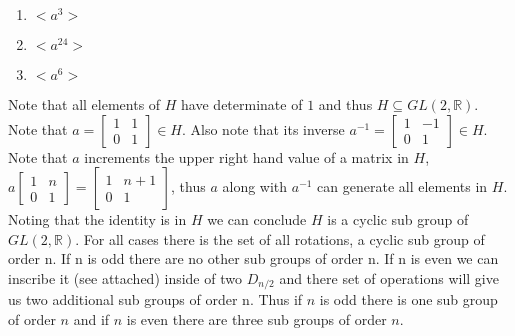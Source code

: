\documentclass[12pt]{article}
\makeatletter
\theoremstyle{homework}
\newenvironment{exercise}[1]
{\def\@currentlabel{#1}\exercisecore}
{\endexercisecore}
\makeatother
\begin{document}
\begin{exercise}
{4.72}
\begin{enumerate}
For each of these it would simply be the greatest common divisor between 48 and the power of $a$.
\item
$<a^3>$
\item
$<a^{24}>$
\item
$<a^6>$
\end{enumerate}
\end{exercise}
\begin{exercise}
{4.74}
Note that all elements of $H$ have determinate of $1$ and thus $H\subseteq GL(2,\mathbb{R})$.  Note that $a=\begin{bmatrix}
1&1\\ 0&1
\end{bmatrix}\in H$.  Also note that its inverse $a^{-1}=\begin{bmatrix}
1&-1\\ 0&1
\end{bmatrix}\in H$.  Note that $a$ increments the upper right hand value of a matrix in $H$, $a\begin{bmatrix}
1&n\\ 0&1
\end{bmatrix}=\begin{bmatrix}
1&n+1\\ 0&1
\end{bmatrix}$, thus $a$ along with $a^{-1}$ can generate all elements in $H$.  Noting that the identity is in $H$ we can conclude $H$ is a cyclic sub group of $GL(2,\mathbb{R})$.
\end{exercise}
\begin{exercise}
{4.81}
For all cases there is the set of all rotations, a cyclic sub group of order n.  If n is odd there are no other sub groups of order n.  If n is even we can inscribe it (see attached) inside of two $D_{n/2}$ and there set of operations will give us two additional sub groups of order n.  Thus if $n$ is odd there is one sub group of order $n$ and if $n$ is even there are three sub groups of order $n$.
\end{exercise}
\end{document}
